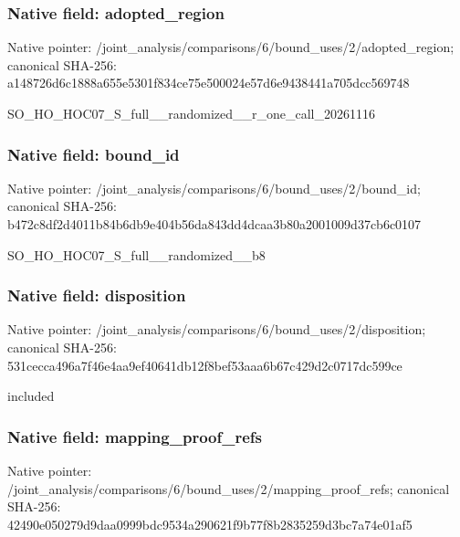 \documentclass[10pt,a4paper]{article}
\begin{document}
\subsubsection{Native field: adopted\_\allowbreak{}region}
Native pointer: /joint\_\allowbreak{}analysis/comparisons/6/bound\_\allowbreak{}uses/2/adopted\_\allowbreak{}region; canonical SHA-256: a148726d6c1888a655e5301f834ce75e500024e57d6e9438441a705dcc569748

\begingroup\raggedright\sloppy SO\_\allowbreak{}HO\_\allowbreak{}HOC07\_\allowbreak{}S\_\allowbreak{}full\_\allowbreak{}\_\allowbreak{}randomized\_\allowbreak{}\_\allowbreak{}r\_\allowbreak{}one\_\allowbreak{}call\_\allowbreak{}20261116\par\endgroup

\subsubsection{Native field: bound\_\allowbreak{}id}
Native pointer: /joint\_\allowbreak{}analysis/comparisons/6/bound\_\allowbreak{}uses/2/bound\_\allowbreak{}id; canonical SHA-256: b472c8df2d4011b84b6db9e404b56da843dd4dcaa3b80a2001009d37cb6c0107

\begingroup\raggedright\sloppy SO\_\allowbreak{}HO\_\allowbreak{}HOC07\_\allowbreak{}S\_\allowbreak{}full\_\allowbreak{}\_\allowbreak{}randomized\_\allowbreak{}\_\allowbreak{}b8\par\endgroup

\subsubsection{Native field: disposition}
Native pointer: /joint\_\allowbreak{}analysis/comparisons/6/bound\_\allowbreak{}uses/2/disposition; canonical SHA-256: 531cecca496a7f46e4aa9ef40641db12f8bef53aaa6b67c429d2c0717dc599ce

\begingroup\raggedright\sloppy included\par\endgroup

\subsubsection{Native field: mapping\_\allowbreak{}proof\_\allowbreak{}refs}
Native pointer: /joint\_\allowbreak{}analysis/comparisons/6/bound\_\allowbreak{}uses/2/mapping\_\allowbreak{}proof\_\allowbreak{}refs; canonical SHA-256: 42490e050279d9daa0999bdc9534a290621f9b77f8b2835259d3bc7a74e01af5
\end{document}
